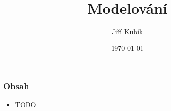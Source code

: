 \documentclass[aspectratio=169]{beamer}
\author{Jiří Kubík}
\title{Modelování}
\date{\today}
\institute{%
\vspace{0.25em}
   {\bf \ps}\\ 
\vspace{0.25em}
   {\bf 2022}\\ 
\vspace{0.25em}
   {\GyBot}\\
\vspace{0.25em}
   {rev. 2022-10-1}
}
\begin{document}
    \begin{frame}
        \titlepage
    \end{frame}

    \begin{frame}[t]
        \frametitle{Obsah}
        \begin{itemize}
            \item TODO
        \end{itemize}
    \end{frame}

    
    
    
\end{document}
